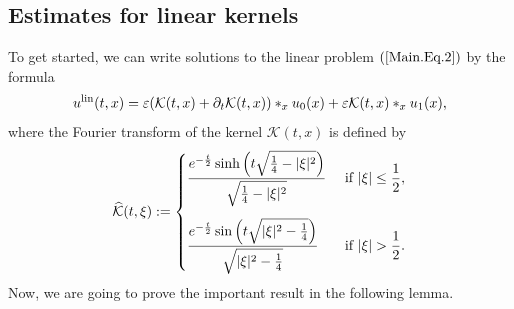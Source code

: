 \documentclass[11pt,reqno]{amsart}
\begin{document}
\subsection{Estimates for linear kernels}
To get started, we can write solutions to the linear problem $(\ref{Main.Eq.2})$ by the formula
\begin{equation*}
 u^{\rm lin}(t,x) = \varepsilon (\mathcal{K}(t,x) +\partial_t \mathcal{K}(t,x))\ast_x u_0(x) + \varepsilon \mathcal{K}(t,x) \ast_x u_1(x),
\end{equation*}
where the Fourier transform of the kernel $\mathcal{K}(t,x)$ is defined by
\begin{align*}
    \widehat{\mathcal{K}}(t,\xi) :=  \begin{cases}
        \vspace{0.3cm}\displaystyle\frac{e^{-\frac{t}{2}}\sinh{\left(t \sqrt{\frac{1}{4} -|\xi|^2}\right)}}{\sqrt{\frac{1}{4}- |\xi|^2}}  &\text{ if } |\xi| \leq \displaystyle\frac{1}{2},\\
        \displaystyle\frac{e^{-\frac{t}{2}}\sin{\left(t \sqrt{|\xi|^2-\frac{1}{4}}\right)}}{\sqrt{|\xi|^2-\frac{1}{4}}} &\text{ if } |\xi| > \displaystyle\frac{1}{2}.
    \end{cases}
\end{align*}
 Now, we are going to prove the important result in the following lemma.
\end{document}
